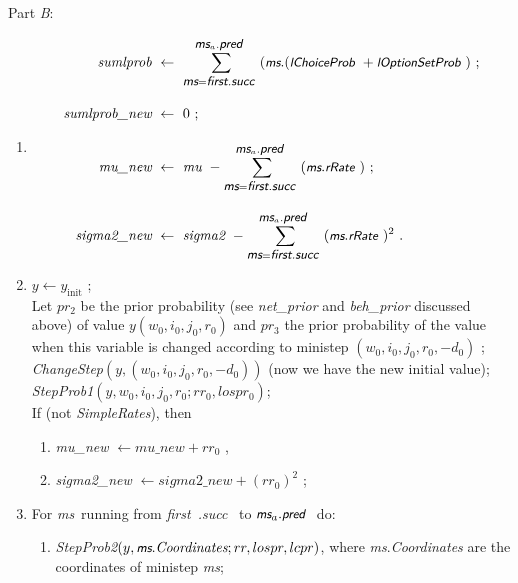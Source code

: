 \documentclass[a4paper,12pt,fleqn]{article}
\newcommand{\nnm}[1]{\textsf{\small\textit{#1}\ }}
\newcommand{\ms}{\textsl{\textsf{\small ms}}} %
\newcommand{\remark}[1]{{\textcolor[named]{Red}{#1}}}
\begin{document}
Part \emph{B}:
\begin{enumerate}[resume]
\item
   \begin{align*}
       \textit{sumlprob} \ & \leftarrow \ \sum_{\ms = \nnm{first.succ}}^{\ms_a.\nnm{pred}}
             (\ms.(\nnm{lChoiceProb} + \nnm{lOptionSetProb}) \ ; \\[1em]
       \textit{sumlprob\_new} \ & \leftarrow  \ 0 \ ;   \\[1em]
      \textit{mu\_new} \  & \leftarrow \ \textit{mu} \ -
                \sum_{\ms = \nnm{first.succ}}^{ \ms_a.\nnm{pred}}
                        (\ms.\nnm{rRate}) \ ; \\[1em]
      \textit{sigma2\_new} \ & \leftarrow \ \textit{sigma2} \ -
                \sum_{\ms = \nnm{first.succ}}^{\ms_a.\nnm{pred}}
                          (\ms.\nnm{rRate})^2 \ .
      \end{align*}
\item %
      $y \leftarrow y_{\text{init}}$ ;\\[1em]
      Let $pr_2$ be the prior probability
      (see \textit{net\_prior} and \textit{beh\_prior} discussed above)
      of value $y(w_0,i_0,j_0,r_0)$
      and $pr_3$ the prior probability of the value when
      this variable is changed according to ministep
      $(w_0,i_0,j_0,r_0,-d_0)$ ;\\[1em]
      \textit{ChangeStep}$(y, (w_0,i_0,j_0,r_0,-d_0))$ (now we have the new initial value);\\[1em]
      \textit{StepProb1}$(y,w_0,i_0,j_0,r_0;  rr_0, lospr_0)$;\\[1em]
      If (not \textit{SimpleRates}), then
      \begin{enumerate}
      \item \textit{mu\_new} $ \leftarrow  \textit{mu\_new} + rr_0 $ ,
      \item \textit{sigma2\_new} $ \leftarrow
           \textit{sigma2\_new}  + (rr_0)^2  $ ;
      \end{enumerate}
\item For \ms \ running from \nnm{\nnm{first}.succ} to $\ms_a.\nnm{pred}$ do:
      \begin{enumerate}
      \item \textit{StepProb2}$(y, \ms.\textit{Coordinates}; rr, lospr, lcpr)$,
            where \ms.\textit{Coordinates} are
            the coordinates of ministep \ms  ;

\end{enumerate}
\end{enumerate}
\end{document}

